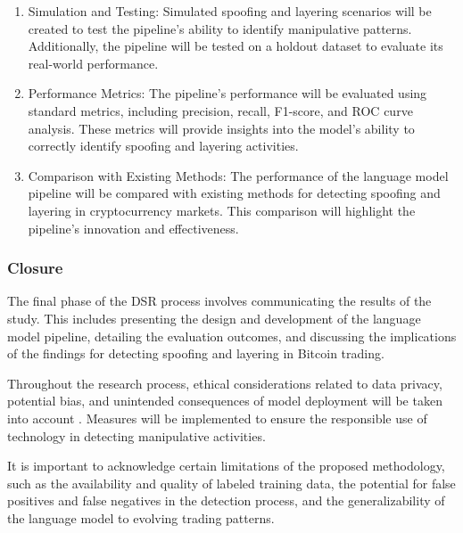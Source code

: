\begin{enumerate}
    \item Simulation and Testing: Simulated spoofing and layering scenarios will be created to test the pipeline's
    ability to identify manipulative patterns. Additionally, the pipeline will be tested on a holdout dataset to
    evaluate its real-world performance.
    \item Performance Metrics: The pipeline's performance will be evaluated using standard metrics, including precision,
    recall, F1-score, and ROC curve analysis. These metrics will provide insights into the model's ability to correctly
    identify spoofing and layering activities.
    \item Comparison with Existing Methods: The performance of the language model pipeline will be compared with
    existing methods for detecting spoofing and layering in cryptocurrency markets. This comparison will highlight the
    pipeline's innovation and effectiveness.
\end{enumerate}

\subsubsection{Closure}
The final phase of the DSR process involves communicating the results of the study. This includes presenting the design
and development of the language model pipeline, detailing the evaluation outcomes, and discussing the implications of
the findings for detecting spoofing and layering in Bitcoin trading.

Throughout the research process, ethical considerations related to data privacy, potential bias, and unintended
consequences of model deployment will be taken into account \cite{barocas2017fairness, mittelstadt2016ethics}. Measures
will be implemented to ensure the responsible use of technology in detecting manipulative activities.

It is important to acknowledge certain limitations of the proposed methodology, such as the availability and quality of
labeled training data, the potential for false positives and false negatives in the detection process, and the
generalizability of the language model to evolving trading patterns.
